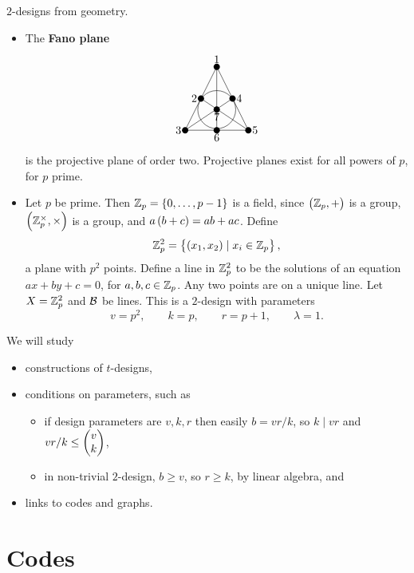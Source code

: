 \begin{example*}
$ 2 $-designs from geometry.
\begin{itemize}
\item The \textbf{Fano plane}
$$
\begin{tikzpicture}
\fill (0, 0) circle (0.1) node[above]{$ 1 $};
\fill (-0.5, -1) circle (0.1) node[left]{$ 2 $};
\fill (0.5, -1) circle (0.1) node[right]{$ 4 $};
\fill (0, -1.35) circle (0.1) node[below]{$ 7 $};
\fill (-1, -2) circle (0.1) node[left]{$ 3 $};
\fill (0, -2) circle (0.1) node[below]{$ 6 $};
\fill (1, -2) circle (0.1) node[right]{$ 5 $};
\draw (0, 0) to (-1, -2);
\draw (0, 0) to (0, -2);
\draw (0, 0) to (1, -2);
\draw (-0.5, -1) to (1, -2);
\draw (0.5, -1) to (-1, -2);
\draw (-1, -2) to (1, -2);
\draw (0, -1.35) circle (0.6);
\end{tikzpicture}
$$
is the projective plane of order two. Projective planes exist for all powers of $ p $, for $ p $ prime.
\item Let $ p $ be prime. Then $ \Z_p = \cbr{0, \dots, p - 1} $ is a field, since $ \br{\Z_p, +} $ is a group, $ \br{\Z_p^\times, \times} $ is a group, and $ a\br{b + c} = ab + ac $. Define
$$ \Z_p^2 = \cbr{\br{x_1, x_2} \mid x_i \in \Z_p}, $$
a plane with $ p^2 $ points. Define a line in $ \mathbb{Z}_p^2 $ to be the solutions of an equation $ ax + by + c = 0 $, for $ a, b, c \in \mathbb{Z}_p $. Any two points are on a unique line. Let $ X = \mathbb{Z}_p^2 $ and $ \mathcal{B} $ be lines. This is a $ 2 $-design with parameters
$$ v = p^2, \qquad k = p, \qquad r = p + 1, \qquad \lambda = 1. $$
\end{itemize}
\end{example*}

We will study
\begin{itemize}
\item constructions of $ t $-designs,
\item conditions on parameters, such as
\begin{itemize}
\item if design parameters are $ v, k, r $ then easily $ b = vr / k $, so $ k \mid vr $ and $ vr / k \le \begin{pmatrix} v \\ k \end{pmatrix} $,
\item in non-trivial $ 2 $-design, $ b \ge v $, so $ r \ge k $, by linear algebra, and
\end{itemize}
\item links to codes and graphs.
\end{itemize}

\pagebreak

\section{Codes}

